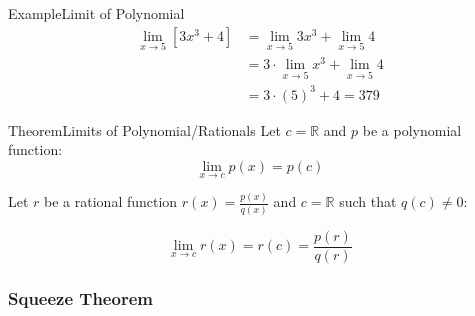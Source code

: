 \documentclass{MathNotes}
\newenvironment{example}[1]{\begin{BlueBox}{Example}{#1}}{\end{BlueBox}}
\newenvironment{theorem}[1]{\begin{GrayBox}{Theorem}{#1}}{\end{GrayBox}}
\begin{document}
\begin{example}{Limit of Polynomial}
	\begin{align*}
		\lim_{x\to 5}[ 3x^3+4 ] & = \lim_{x\to 5} 3x^3 + \lim_{x\to 5}4       \\
		                        & = 3 \cdot \lim_{x\to 5}x^3 + \lim_{x\to 5}4 \\
		                        & = 3 \cdot (5)^3 + 4=379
	\end{align*}
\end{example}

\begin{theorem}{Limits of Polynomial/Rationals}
	Let $c=\mathbb{R}$ and $p$ be a polynomial function:
	\begin{displaymath}
		\lim_{x\to c}p(x)=p(c)
	\end{displaymath}

	Let $r$ be a rational function $r(x)=\frac{p(x)}{q(x)}$ and $c=\mathbb{R}$
	such that $q(c)\neq 0$:

	\begin{displaymath}
		\lim_{x\to c}r(x)=r(c)=\frac{p(r)}{q(r)}
	\end{displaymath}
\end{theorem}

\newpage
\subsubsection{Squeeze Theorem}\label{sec:1.2.2}
\end{document}
